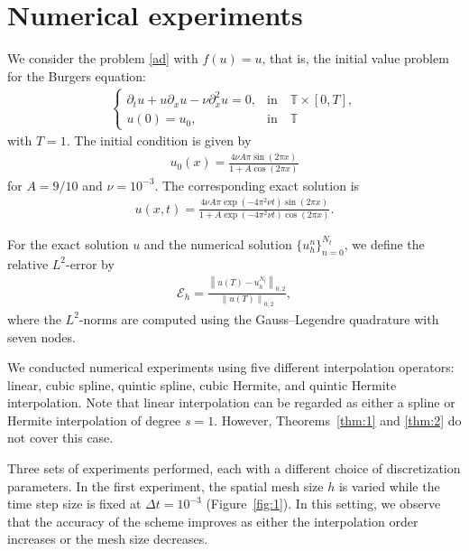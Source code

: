 \documentclass[10pt,a4paper,tbtags,leqno]{amsart}
\theoremstyle{definition}
\numberwithin{equation}{section}
\def\norm#1#2{\left\|#2\right\|_{#1}}
\begin{document}
\section{Numerical experiments} 
\label{s:4} 

We consider the problem \eqref{ad} with $ f (u) = u $, that is, the initial value problem for the Burgers equation: 
\begin{align} 
  \begin{cases} 
    \partial_t u + u \partial_x u - \nu \partial_x^2 u = 0, & \text{in} \quad \mathbb{T} \times [0, T], \\ 
    u(0) = u_0, & \text{in} \quad \mathbb{T} 
  \end{cases} 
\end{align} 
with $ T = 1 $. The initial condition is given by 
\begin{align} 
  u_0 (x) = \frac{4 \nu A \pi \sin (2 \pi x)}{1 + A \cos (2 \pi x)} 
\end{align} 
for $ A = 9/10 $ and $ \nu = 10^{-3} $. The corresponding exact solution is 
\begin{align} 
  u (x, t) = \frac{4 \nu A \pi \exp (- 4 \pi^2 \nu t) \sin (2 \pi x)}{1 + A \exp (- 4 \pi^2 \nu t) \cos (2 \pi x)}. 
\end{align} 

For the exact solution $ u $ and the numerical solution $ \{u_h^n\}_{n=0}^{N_t} $, we define the relative $ L^2 $-error by 
\begin{align} 
  \mathcal{E}_h = \frac{\norm{0,2}{u(T) - u_h^{N_t}}}{\norm{0,2}{u(T)}}, 
\end{align}
where the $ L^2 $-norms are computed using the Gauss--Legendre quadrature with seven nodes. 

We conducted numerical experiments using five different interpolation operators: linear, cubic spline, quintic spline, cubic Hermite, and quintic Hermite interpolation. Note that linear interpolation can be regarded as either a spline or Hermite interpolation of degree $ s = 1 $. However, Theorems~\ref{thm:1} and \ref{thm:2} do not cover this case. 

Three sets of experiments performed, each with a different choice of discretization parameters. In the first experiment, the spatial mesh size $h$ is varied while the time step size is fixed at $\Delta t = 10^{-3}$ (Figure~\ref{fig:1}). In this setting, we observe that the accuracy of the scheme improves as either the interpolation order increases or the mesh size decreases. 
\end{document}
